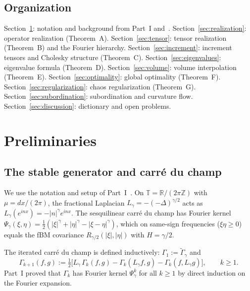 \documentclass[11pt,a4paper]{article}
\theoremstyle{plain}
\theoremstyle{definition}
\theoremstyle{remark}
\newcommand{\R}{\mathbb{R}}
\newcommand{\Z}{\mathbb{Z}}
\newcommand{\T}{\mathbb{T}}
\begin{document}
\subsection{Organization}

Section~\ref{sec:prelim}: notation and background
from Part~I and~\cite{Fontes2026opderiv}.
Section~\ref{sec:realization}: operator realization
(Theorem~A).
Section~\ref{sec:tensor}: tensor realization
(Theorem~B) and the Fourier hierarchy.
Section~\ref{sec:increment}: increment tensors and
Cholesky structure (Theorem~C).
Section~\ref{sec:eigenvalues}: eigenvalue formula
(Theorem~D).
Section~\ref{sec:volume}: volume interpolation
(Theorem~E).
Section~\ref{sec:optimality}: global optimality
(Theorem~F).
Section~\ref{sec:regularization}: chaos regularization
(Theorem~G).
Section~\ref{sec:subordination}: subordination and
curvature flow.
Section~\ref{sec:discussion}: dictionary and open problems.


\section{Preliminaries}\label{sec:prelim}

\subsection{The stable generator and carr\'e du champ}

We use the notation and setup of Part~I~\cite{Fontes2026b}.
On $\T = \R/(2\pi\Z)$ with $\mu = dx/(2\pi)$, the
fractional Laplacian $L_\gamma = -(-\Delta)^{\gamma/2}$
acts as $L_\gamma(e^{inx}) = -|n|^\gamma e^{inx}$.
The sesquilinear carr\'e du champ has Fourier kernel
$\Psi_\gamma(\xi,\eta)
= \frac{1}{2}(|\xi|^\gamma + |\eta|^\gamma
- |\xi-\eta|^\gamma)$,
which on same-sign frequencies ($\xi\eta \geq 0$)
equals the fBM covariance $R_{\gamma/2}(|\xi|,|\eta|)$
with $H = \gamma/2$.

The iterated carr\'e du champ is defined inductively:
$\Gamma_1 := \widetilde{\Gamma}_\gamma$ and
\begin{equation}\label{eq:Gammak-def}
  \Gamma_{k+1}(f,g)
  := \tfrac{1}{2}\bigl[
    L_\gamma\,\Gamma_k(f,g)
    - \Gamma_k(L_\gamma f, g)
    - \Gamma_k(f, L_\gamma g)
  \bigr],
  \qquad k \geq 1.
\end{equation}
Part~I proved that $\Gamma_k$ has Fourier kernel
$\Psi_\gamma^k$ for all $k \geq 1$ by direct induction
on the Fourier expansion.
\end{document}

